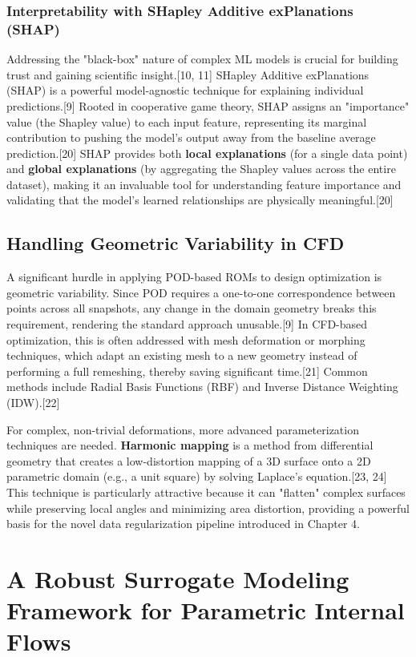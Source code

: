 \documentclass[12pt, a4paper]{report}
\begin{document}
\subsection{Interpretability with SHapley Additive exPlanations (SHAP)}
Addressing the "black-box" nature of complex ML models is crucial for building trust and gaining scientific insight.[10, 11] SHapley Additive exPlanations (SHAP) is a powerful model-agnostic technique for explaining individual predictions.[9] Rooted in cooperative game theory, SHAP assigns an "importance" value (the Shapley value) to each input feature, representing its marginal contribution to pushing the model's output away from the baseline average prediction.[20] SHAP provides both \textbf{local explanations} (for a single data point) and \textbf{global explanations} (by aggregating the Shapley values across the entire dataset), making it an invaluable tool for understanding feature importance and validating that the model's learned relationships are physically meaningful.[20]

\section{Handling Geometric Variability in CFD}
A significant hurdle in applying POD-based ROMs to design optimization is geometric variability. Since POD requires a one-to-one correspondence between points across all snapshots, any change in the domain geometry breaks this requirement, rendering the standard approach unusable.[9] In CFD-based optimization, this is often addressed with mesh deformation or morphing techniques, which adapt an existing mesh to a new geometry instead of performing a full remeshing, thereby saving significant time.[21] Common methods include Radial Basis Functions (RBF) and Inverse Distance Weighting (IDW).[22]

For complex, non-trivial deformations, more advanced parameterization techniques are needed. \textbf{Harmonic mapping} is a method from differential geometry that creates a low-distortion mapping of a 3D surface onto a 2D parametric domain (e.g., a unit square) by solving Laplace's equation.[23, 24] This technique is particularly attractive because it can "flatten" complex surfaces while preserving local angles and minimizing area distortion, providing a powerful basis for the novel data regularization pipeline introduced in Chapter 4.

\chapter{A Robust Surrogate Modeling Framework for Parametric Internal Flows}
\end{document}
